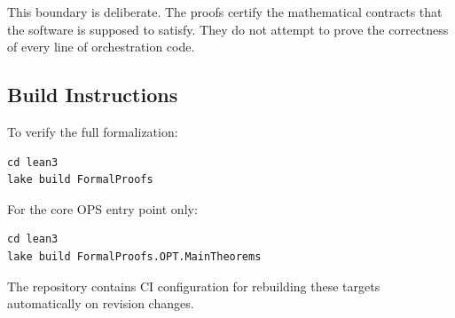 This boundary is deliberate. The proofs certify the mathematical contracts that
the software is supposed to satisfy. They do not attempt to prove the correctness
of every line of orchestration code.

\subsection{Build Instructions}

To verify the full formalization:

\begin{lstlisting}
cd lean3
lake build FormalProofs
\end{lstlisting}

For the core OPS entry point only:

\begin{lstlisting}
cd lean3
lake build FormalProofs.OPT.MainTheorems
\end{lstlisting}

The repository contains CI configuration for rebuilding these targets
automatically on revision changes.
